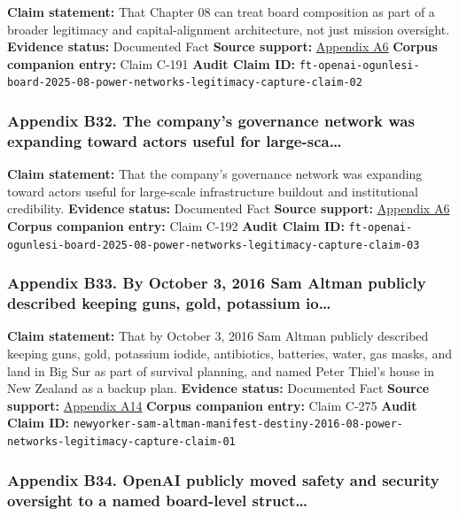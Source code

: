 \documentclass[
  american,
  11pt,
  letterpaper,
]{article}
\begin{document}
\textbf{Claim statement:} That Chapter 08 can treat board composition as
part of a broader legitimacy and capital-alignment architecture, not
just mission oversight. \textbf{Evidence status:} Documented Fact
\textbf{Source support:}
\hyperref[ch-08-appendix-a6-openai-appoints-one-of-wall-street-s-most-powerful-dealmakers-to-its-board]{Appendix
A6} \textbf{Corpus companion entry:} Claim C-191 \textbf{Audit Claim
ID:}
\texttt{ft-openai-ogunlesi-board-2025-08-power-networks-legitimacy-capture-claim-02}

\subsubsection{Appendix B32. The company's governance network was
expanding toward actors useful for
large-sca\ldots{}}\label{ch-08-appendix-b32-the-company-s-governance-network-was-expanding-toward-actors-useful-for-large-sca}

\textbf{Claim statement:} That the company's governance network was
expanding toward actors useful for large-scale infrastructure buildout
and institutional credibility. \textbf{Evidence status:} Documented Fact
\textbf{Source support:}
\hyperref[ch-08-appendix-a6-openai-appoints-one-of-wall-street-s-most-powerful-dealmakers-to-its-board]{Appendix
A6} \textbf{Corpus companion entry:} Claim C-192 \textbf{Audit Claim
ID:}
\texttt{ft-openai-ogunlesi-board-2025-08-power-networks-legitimacy-capture-claim-03}

\subsubsection{Appendix B33. By October 3, 2016 Sam Altman publicly
described keeping guns, gold, potassium
io\ldots{}}\label{ch-08-appendix-b33-by-october-3-2016-sam-altman-publicly-described-keeping-guns-gold-potassium-io}

\textbf{Claim statement:} That by October 3, 2016 Sam Altman publicly
described keeping guns, gold, potassium iodide, antibiotics, batteries,
water, gas masks, and land in Big Sur as part of survival planning, and
named Peter Thiel's house in New Zealand as a backup plan.
\textbf{Evidence status:} Documented Fact \textbf{Source support:}
\hyperref[ch-08-appendix-a14-sam-altman-s-manifest-destiny]{Appendix
A14} \textbf{Corpus companion entry:} Claim C-275 \textbf{Audit Claim
ID:}
\texttt{newyorker-sam-altman-manifest-destiny-2016-08-power-networks-legitimacy-capture-claim-01}

\subsubsection{Appendix B34. OpenAI publicly moved safety and security
oversight to a named board-level
struct\ldots{}}\label{ch-08-appendix-b34-openai-publicly-moved-safety-and-security-oversight-to-a-named-board-level-struct}
\end{document}

